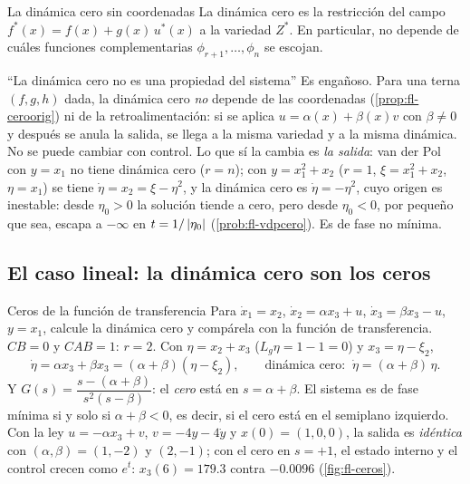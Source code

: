 \begin{proposicion}[label=prop:fl-ceroorig]{La dinámica cero sin coordenadas}
La dinámica cero es la restricción del campo $f^*(x)=f(x)+g(x)\,u^*(x)$ a la variedad $Z^*$. En particular, no depende de cuáles funciones complementarias $\phi_{r+1},\dots,\phi_n$ se escojan.
\end{proposicion}

\begin{trampa}[label=tr:fl-intrinseca]{``La dinámica cero no es una propiedad del sistema''}
Es engañoso. Para una terna $(f,g,h)$ dada, la dinámica cero \emph{no} depende de las coordenadas (\cref{prop:fl-ceroorig}) ni de la retroalimentación: si se aplica $u=\alpha(x)+\beta(x)v$ con $\beta\neq0$ y después se anula la salida, se llega a la misma variedad y a la misma dinámica. No se puede cambiar con control. Lo que sí la cambia es \emph{la salida}: van der Pol con $y=x_1$ no tiene dinámica cero ($r=n$); con $y=x_1^2+x_2$ ($r=1$, $\xi=x_1^2+x_2$, $\eta=x_1$) se tiene $\dot\eta=x_2=\xi-\eta^2$, y la dinámica cero es $\dot\eta=-\eta^2$, cuyo origen es inestable: desde $\eta_0>0$ la solución tiende a cero, pero desde $\eta_0<0$, por pequeño que sea, escapa a $-\infty$ en $t=1/\left\lvert \eta_0\right\rvert$ (\cref{prob:fl-vdpcero}). Es de fase no mínima.
\end{trampa}

\subsection{El caso lineal: la dinámica cero son los ceros}

\begin{ejemplo}[label=ej:fl-cerolineal]{Ceros de la función de transferencia}
Para $\dot x_1=x_2$, $\dot x_2=\alpha x_3+u$, $\dot x_3=\beta x_3-u$, $y=x_1$, calcule la dinámica cero y compárela con la función de transferencia.
\solucion $CB=0$ y $CAB=1$: $r=2$. Con $\eta=x_2+x_3$ ($L_g\eta=1-1=0$) y $x_3=\eta-\xi_2$,
\[
  \dot\eta=\alpha x_3+\beta x_3=(\alpha+\beta)(\eta-\xi_2),
  \qquad\text{dinámica cero: }\ \dot\eta=(\alpha+\beta)\,\eta .
\]
Y $G(s)=\dfrac{s-(\alpha+\beta)}{s^2(s-\beta)}$: el \emph{cero} está en $s=\alpha+\beta$. El sistema es de fase mínima si y solo si $\alpha+\beta<0$, es decir, si el cero está en el semiplano izquierdo. Con la ley $u=-\alpha x_3+v$, $v=-4y-4\dot y$ y $x(0)=(1,0,0)$, la salida es \emph{idéntica} con $(\alpha,\beta)=(1,-2)$ y $(2,-1)$; con el cero en $s=+1$, el estado interno y el control crecen como $e^{t}$: $x_3(6)=179.3$ contra $-0.0096$ (\cref{fig:fl-ceros}).
\end{ejemplo}

